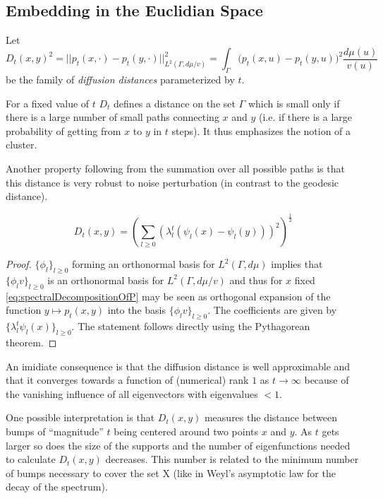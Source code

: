 \subsection{Embedding in the Euclidian Space}
\begin{definition}
Let $$D_t(x,y)^2 =
||p_t(x, \cdotp) - p_t(y, \cdotp)||_{L^2(\Gamma, d\mu/v)}^2 =
\int_\Gamma \big(p_t(x, u) - p_t(y, u)\big)^2 \frac{d\mu(u)}{v(u)}$$
be the family of \textit{diffusion distances} parameterized by $t$.
\end{definition}

For a fixed value of $t$ $D_t$ defines a distance on the set $\Gamma$ which is small only if there is a large number of small paths connecting $x$ and $y$ (i.e. if there is a large probability of getting from $x$ to $y$ in $t$ steps). It thus emphasizes the notion of a cluster.

Another property following from the summation over all possible paths is that this distance is very robust to noise perturbation (in contrast to the geodesic distance).

\begin{theorem}
$$D_t(x,y)=\left(\sum_{l\geq 0} \left(\lambda_l^t(\psi_l(x) - \psi_l(y))\right)^2 \right)^{\frac{1}{2}}$$
\end{theorem}

\begin{proof}
$\{\phi_l\}_{l\geq 0}$ forming an orthonormal basis for $L^2(\Gamma, d\mu)$ implies that $\{\phi_l v\}_{l\geq 0}$ is an orthonormal basis for $L^2(\Gamma, d\mu/v)$ and thus for $x$ fixed \eqref{eq:spectralDecompositionOfP} may be seen as orthogonal expansion of the function $y \mapsto p_t(x,y)$ into the basis $\{\phi_l v\}_{l\geq 0}$.
The coefficients are given by $\{\lambda_l^t \psi_l(x)\}_{l\geq 0}$. The statement follows directly using the Pythagorean theorem.
\end{proof}

An imidiate consequence is that the diffusion distance is well approximable and that it converges towards a function of (numerical) rank $1$ as $t\rightarrow\infty$ because of the vanishing influence of all eigenvectors with eigenvalues $<1$.

One possible interpretation is that $D_t(x,y)$ measures the distance between bumps of ``magnitude'' $t$ being centered around two points $x$ and $y$. As $t$ gets larger so does the size of the supports and the number of eigenfunctions needed to calculate $D_t(x,y)$ decreases. This number is related to the minimum number of bumps necessary to cover the set X (like in Weyl’s asymptotic law for the decay of the spectrum).


